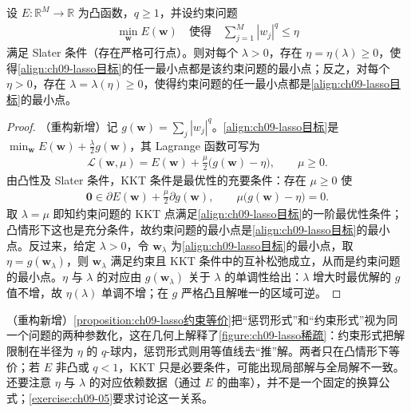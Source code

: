 \documentclass[../../main.tex]{subfiles}
\begin{document}
\begin{proposition}\label{proposition:ch09-lasso约束等价}
设 $E:\mathbb{R}^{M}\to\mathbb{R}$ 为凸函数，$q\geqslant1$，并设约束问题
\begin{align*}
\min_{\boldsymbol{w}}E(\boldsymbol{w})\quad\text{使得}\quad\sum_{j=1}^{M}|w_{j}|^{q}\leqslant\eta
\end{align*}
满足 Slater 条件（存在严格可行点）。则对每个 $\lambda>0$，存在 $\eta=\eta(\lambda)\geqslant0$，使得\eqref{align:ch09-lasso目标}的任一最小点都是该约束问题的最小点；反之，对每个 $\eta>0$，存在 $\lambda=\lambda(\eta)\geqslant0$，使得约束问题的任一最小点都是\eqref{align:ch09-lasso目标}的最小点。
\end{proposition}

\begin{proof}
（重构新增）记 $g(\boldsymbol{w})=\sum_{j}|w_{j}|^{q}$。\eqref{align:ch09-lasso目标}是 $\min_{\boldsymbol{w}}E(\boldsymbol{w})+\frac{\lambda}{2}g(\boldsymbol{w})$，其 Lagrange 函数可写为
\begin{align*}
\mathcal{L}(\boldsymbol{w},\mu)=E(\boldsymbol{w})+\frac{\mu}{2}\bigl(g(\boldsymbol{w})-\eta\bigr),\qquad \mu\geqslant0.
\end{align*}
由凸性及 Slater 条件，KKT 条件是最优性的充要条件：存在 $\mu\geqslant0$ 使
\begin{align*}
\boldsymbol{0}\in\partial E(\boldsymbol{w})+\frac{\mu}{2}\partial g(\boldsymbol{w}),\qquad \mu\bigl(g(\boldsymbol{w})-\eta\bigr)=0.
\end{align*}
取 $\lambda=\mu$ 即知约束问题的 KKT 点满足\eqref{align:ch09-lasso目标}的一阶最优性条件；凸情形下这也是充分条件，故约束问题的最小点是\eqref{align:ch09-lasso目标}的最小点。反过来，给定 $\lambda>0$，令 $\boldsymbol{w}_{\lambda}$ 为\eqref{align:ch09-lasso目标}的最小点，取 $\eta=g(\boldsymbol{w}_{\lambda})$，则 $\boldsymbol{w}_{\lambda}$ 满足约束且 KKT 条件中的互补松弛成立，从而是约束问题的最小点。$\eta$ 与 $\lambda$ 的对应由 $g(\boldsymbol{w}_{\lambda})$ 关于 $\lambda$ 的单调性给出：$\lambda$ 增大时最优解的 $g$ 值不增，故 $\eta(\lambda)$ 单调不增；在 $g$ 严格凸且解唯一的区域可逆。
\end{proof}

\begin{remark}（重构新增）\cref{proposition:ch09-lasso约束等价}把“惩罚形式”和“约束形式”视为同一个问题的两种参数化，这在几何上解释了\cref{figure:ch09-lasso稀疏}：约束形式把解限制在半径为 $\eta$ 的 $q$-球内，惩罚形式则用等值线去“推”解。两者只在凸情形下等价；若 $E$ 非凸或 $q<1$，KKT 只是必要条件，可能出现局部解与全局解不一致。还要注意 $\eta$ 与 $\lambda$ 的对应依赖数据（通过 $E$ 的曲率），并不是一个固定的换算公式；\cref{exercise:ch09-05}要求讨论这一关系。
\end{remark}
\end{document}
